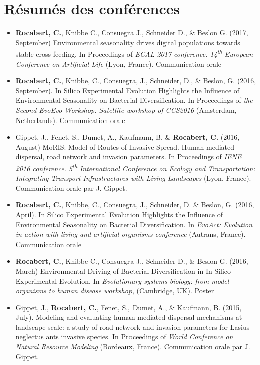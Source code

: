 \section*{Résumés des conférences}
\begin{itemize}
\item \textbf{Rocabert, C.}, Knibbe C., Consuegra J., Schneider D., \& Beslon G. (2017, September) Environmental seasonality drives digital populations towards stable cross-feeding. In Proceedings of \textit{ECAL 2017 conference. 14\textsuperscript{th} European Conference on Artificial Life} (Lyon, France). Communication orale
\item \textbf{Rocabert, C.}, Knibbe, C., Consuegra, J., Schneider, D., \& Beslon, G. (2016, September). In Silico Experimental Evolution Highlights the Influence of Environmental Seasonality on Bacterial Diversification. In Proceedings of \textit{the Second EvoEvo Workshop. Satellite workshop of CCS2016} (Amsterdam, Netherlands). Communication orale
\item Gippet, J., Fenet, S., Dumet, A., Kaufmann, B. \& \textbf{Rocabert, C.} (2016, August) MoRIS: Model of Routes of Invasive Spread. Human-mediated dispersal, road network and invasion parameters. In Proceedings of \textit{IENE 2016 conference. 5\textsuperscript{th} International Conference on Ecology and Transportation: Integrating Transport Infrastructures with Living Landscapes} (Lyon, France). Communication orale par J. Gippet.
\item \textbf{Rocabert, C.}, Knibbe, C., Consuegra, J., Schneider, D. \& Beslon, G. (2016, April). In Silico Experimental Evolution Highlights the Influence of Environmental Seasonality on Bacterial Diversification. In \textit{EvoAct: Evolution in action with living and artificial organisms conference} (Autrans, France). Communication orale
\item \textbf{Rocabert, C.}, Knibbe C., Consuegra J., Schneider D., \& Beslon G. (2016, March) Environmental Driving of Bacterial Diversification in In Silico Experimental Evolution. In \textit{Evolutionary systems biology: from model organisms to human disease workshop}, (Cambridge, UK). Poster
\item Gippet, J., \textbf{Rocabert, C.}, Fenet, S., Dumet, A., \& Kaufmann, B. (2015, July). Modeling and evaluating human-mediated dispersal mechanisms at landscape scale: a study of road network and invasion parameters for Lasius neglectus ants invasive species. In Proceedings of \textit{World Conference on Natural Resource Modeling} (Bordeaux, France). Communication orale par J. Gippet.
\end{itemize}
